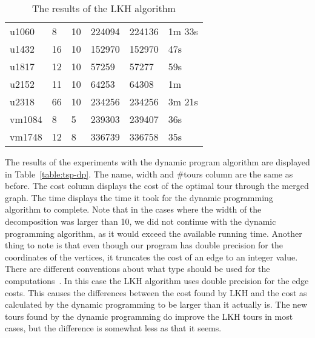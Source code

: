 \documentclass[titlepage, 12pt]{article}
\begin{document}
\begin{table}
\begin{tabular}{l l l l l l}
        u1060   & 8     & 10        & 224094    & 224136    & 1m 33s \\
        u1432   & 16    & 10        & 152970    & 152970    & 47s \\
        u1817   & 12    & 10        & 57259     & 57277     & 59s \\
        u2152   & 11    & 10        & 64253     & 64308     & 1m \\
        u2318   & 66    & 10        & 234256    & 234256    & 3m 21s \\
        vm1084  & 8     & 5         & 239303    & 239407    & 36s \\
        vm1748  & 12    & 8         & 336739    & 336758    & 35s \\
    \end{tabular}
    \caption{The results of the LKH algorithm}
    \label{table:tsp-heuristics}
    \end{table}

    The results of the experiments with the dynamic program algorithm are displayed in
    Table~\ref{table:tsp-dp}. The name, width and \#tours column are the same as before. The cost
    column displays the cost of the optimal tour through the merged graph. The time displays the
    time it took for the dynamic programming algorithm to complete.
    Note that in the cases where the width of the decomposition was larger than 10, we did not
    continue with the dynamic programming algorithm, as it would exceed the available running time.
    Another thing to note is that even though our program has double precision for the coordinates
    of the vertices, it truncates the cost of an edge to an integer value. There are different
    conventions about what type should be used for the computations~\cite{vrp-summary-1}. In this
    case the LKH algorithm uses double precision for the edge costs. This causes the differences
    between the cost found by LKH and the cost as calculated by the dynamic programming to be
    larger than it actually is. The new tours found by the dynamic programming do improve the LKH
    tours in most cases, but the difference is somewhat less as that it seems.
\end{document}
